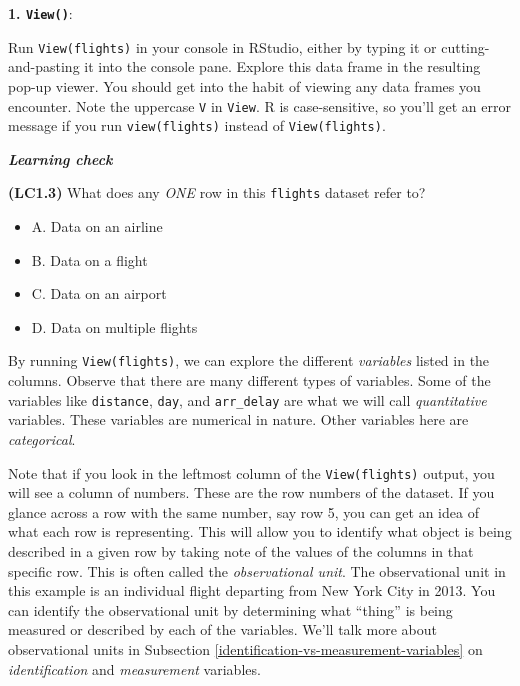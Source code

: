 \documentclass[]{book}
\providecommand{\tightlist}{%
  \setlength{\itemsep}{0pt}\setlength{\parskip}{0pt}}
\begin{document}
\textbf{1. \texttt{View()}}:

Run \texttt{View(flights)}  in your console in RStudio, either by typing it or cutting-and-pasting it into the console pane. Explore this data frame in the resulting pop-up viewer. You should get into the habit of viewing any data frames you encounter. Note the uppercase \texttt{V} in \texttt{View}. R is case-sensitive, so you'll get an error message if you run \texttt{view(flights)} instead of \texttt{View(flights)}.

\begin{learncheck}
\vspace{-0.25in}

\textbf{\emph{Learning check}} \vspace{-0.25in}
\end{learncheck}

\textbf{(LC1.3)} What does any \emph{ONE} row in this \texttt{flights} dataset refer to?

\begin{itemize}
\tightlist
\item
  A. Data on an airline
\item
  B. Data on a flight
\item
  C. Data on an airport
\item
  D. Data on multiple flights
\end{itemize}

\begin{learncheck}
\vspace{-0.25in}
\vspace{-0.25in}
\end{learncheck}

By running \texttt{View(flights)}, we can explore the different \emph{variables} listed in the columns. Observe that there are many different types of variables. Some of the variables like \texttt{distance}, \texttt{day}, and \texttt{arr\_delay} are what we will call \emph{quantitative} variables.  These variables are numerical in nature. Other variables here are  \emph{categorical}.

Note that if you look in the leftmost column of the \texttt{View(flights)} output, you will see a column of numbers. These are the row numbers of the dataset. If you glance across a row with the same number, say row 5, you can get an idea of what each row is representing. This will allow you to identify what object is being described in a given row by taking note of the values of the columns in that specific row. This is often called the \emph{observational unit}. The observational unit in this example is an individual flight departing from New York City in 2013. You can identify the observational unit by determining what ``thing'' is being measured or described by each of the variables. We'll talk more about observational units in Subsection \ref{identification-vs-measurement-variables} on \emph{identification} and \emph{measurement} variables.
\end{document}
